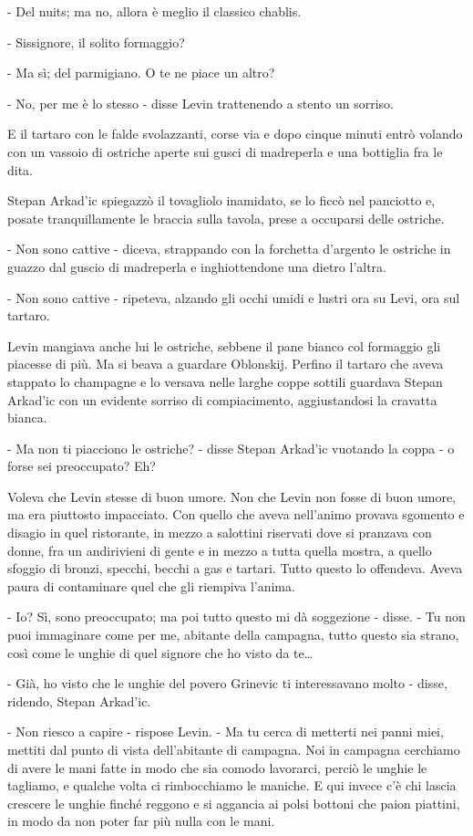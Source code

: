 - Del nuits; ma no, allora è meglio il classico chablis. 

- Sissignore, il solito formaggio? 

- Ma sì; del parmigiano. O te ne piace un altro? 

- No, per me è lo stesso - disse Levin trattenendo a stento un sorriso. 

E il tartaro con le falde svolazzanti, corse via e dopo cinque minuti entrò volando con un vassoio di ostriche aperte sui gusci di madreperla e una bottiglia fra le dita. 

Stepan Arkad'ic spiegazzò il tovagliolo inamidato, se lo ficcò nel panciotto e, posate tranquillamente le braccia sulla tavola, prese a occuparsi delle ostriche. 

- Non sono cattive - diceva, strappando con la forchetta d'argento le ostriche in guazzo dal guscio di madreperla e inghiottendone una dietro l'altra. 

- Non sono cattive - ripeteva, alzando gli occhi umidi e lustri ora su Levi, ora sul tartaro. 

Levin mangiava anche lui le ostriche, sebbene il pane bianco col formaggio gli piacesse di più. Ma si beava a guardare Oblonskij. Perfino il tartaro che aveva stappato lo champagne e lo versava nelle larghe coppe sottili guardava Stepan Arkad'ic con un evidente sorriso di compiacimento, aggiustandosi la cravatta bianca. 

- Ma non ti piacciono le ostriche? - disse Stepan Arkad'ic vuotando la coppa - o forse sei preoccupato? Eh? 

Voleva che Levin stesse di buon umore. Non che Levin non fosse di buon umore, ma era piuttosto impacciato. Con quello che aveva nell'animo provava sgomento e disagio in quel ristorante, in mezzo a salottini riservati dove si pranzava con donne, fra un andirivieni di gente e in mezzo a tutta quella mostra, a quello sfoggio di bronzi, specchi, becchi a gas e tartari. Tutto questo lo offendeva. Aveva paura di contaminare quel che gli riempiva l'anima. 

- Io? Sì, sono preoccupato; ma poi tutto questo mi dà soggezione - disse. - Tu non puoi immaginare come per me, abitante della campagna, tutto questo sia strano, così come le unghie di quel signore che ho visto da te\ldots{} 

- Già, ho visto che le unghie del povero Grinevic ti interessavano molto - disse, ridendo, Stepan Arkad'ic. 

- Non riesco a capire - rispose Levin. - Ma tu cerca di metterti nei panni miei, mettiti dal punto di vista dell'abitante di campagna. Noi in campagna cerchiamo di avere le mani fatte in modo che sia comodo lavorarci, perciò le unghie le tagliamo, e qualche volta ci rimbocchiamo le maniche. E qui invece c'è chi lascia crescere le unghie finché reggono e si aggancia ai polsi bottoni che paion piattini, in modo da non poter far più nulla con le mani. 

